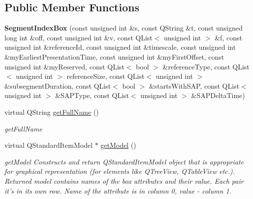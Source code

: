 \subsection*{Public Member Functions}
\begin{DoxyCompactItemize}
\item 
\hypertarget{class_segment_index_box_a01d3b470f619c9478d7c06a3199976ff}{{\bfseries Segment\-Index\-Box} (const unsigned int \&s, const Q\-String \&t, const unsigned long int \&off, const unsigned int \&v, const Q\-List$<$ unsigned int $>$ \&f, const unsigned int \&reference\-Id, const unsigned int \&timescale, const unsigned int \&my\-Earliest\-Presentation\-Time, const unsigned int \&my\-First\-Offset, const unsigned int \&my\-Reserved, const Q\-List$<$ bool $>$ \&reference\-Type, const Q\-List$<$ unsigned int $>$ reference\-Size, const Q\-List$<$ unsigned int $>$ \&subsegment\-Duration, const Q\-List$<$ bool $>$ \&starts\-With\-S\-A\-P, const Q\-List$<$ unsigned int $>$ \&S\-A\-P\-Type, const Q\-List$<$ unsigned int $>$ \&S\-A\-P\-Delta\-Time)}\label{class_segment_index_box_a01d3b470f619c9478d7c06a3199976ff}

\item 
virtual Q\-String \hyperlink{class_segment_index_box_a7e3ded610e2f9811909f2152071b7eb8}{get\-Full\-Name} ()
\begin{DoxyCompactList}\small\item\em get\-Full\-Name \end{DoxyCompactList}\item 
virtual Q\-Standard\-Item\-Model $\ast$ \hyperlink{class_segment_index_box_afc289658b786949624da7dc920ebd5e6}{get\-Model} ()
\begin{DoxyCompactList}\small\item\em get\-Model Constructs and return Q\-Standard\-Item\-Model object that is appropriate for graphical representation (for elements like Q\-Tree\-View, Q\-Table\-View etc.). Returned model contains names of the box attributes and their value. Each pair it's in its own row. Name of the attribute is in column 0, value -\/ column 1. \end{DoxyCompactList}\end{DoxyCompactItemize}
